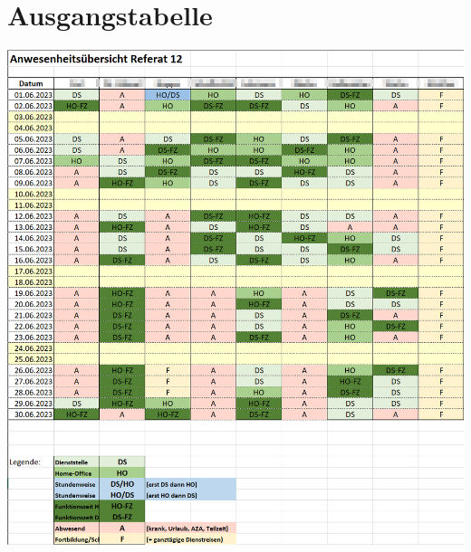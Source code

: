 \section{Ausgangstabelle}
\label{abb:Ausgangstabelle}
\includegraphics[page=1,height=1\textwidth]{anhang/abb/Tabelle.png}